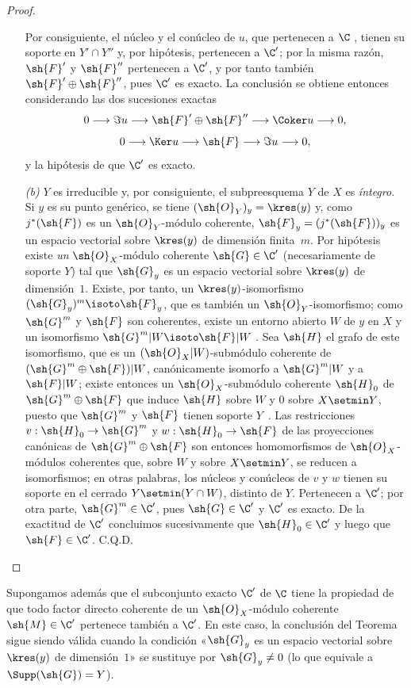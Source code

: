 \documentclass[oneside]{amsart}
\makeatletter
\newcommand{\ega@arrow}[2]{\mathchoice{#1}{#2}{#2}{#2}}
\renewcommand{\to}{\ega@arrow{\longrightarrow}{\rightarrow}}
\let\EGAOriginalLabel\label
\renewcommand{\label}[1]{\phantomsection\EGAOriginalLabel{#1}}
\makeatother
\begin{document}
\begin{proof}
\begin{enumerate}
    Por consiguiente, el núcleo y el conúcleo de $u$, que pertenecen a $\C$ , tienen su soporte en $Y'\cap Y''$ y, por hipótesis, pertenecen a $\C'$; por la misma razón, $\sh{F}'$ y $\sh{F}''$ pertenecen a $\C'$, y por tanto también $\sh{F}'\oplus\sh{F}''$, pues $\C'$ es exacto.
    La conclusión se obtiene entonces considerando las dos sucesiones exactas
    \[
      0\to\Im u\to\sh{F}'\oplus\sh{F}''\to\Coker u\to 0,
    \]
    \[
      0\to\Ker u\to\sh{F}\to\Im u\to 0,
    \]
    y la hipótesis de que $\C'$ es exacto.
  \item[\textit{(b)}] $Y$ es irreducible y, por consiguiente, el subpreesquema $Y$ de $X$ es \emph{íntegro}.
    Si $y$ es su punto genérico, se tiene $(\sh{O}_Y)_y=\kres(y)$ y, como $j^*(\sh{F})$ es un $\sh{O}_Y$-módulo coherente, $\sh{F}_y=(j^*(\sh{F}))_y$ es un espacio vectorial sobre $\kres(y)$ de dimensión finita~$m$.
    Por hipótesis existe \emph{un} $\sh{O}_X$-módulo coherente $\sh{G}\in\C'$ (necesariamente de soporte $Y$) tal que $\sh{G}_y$ es un espacio vectorial sobre $\kres(y)$ de dimensión~$1$.
    Existe, por tanto, un $\kres(y)$-isomorfismo $(\sh{G}_y)^m\isoto\sh{F}_y$, que es también un $\sh{O}_Y$-isomorfismo; como $\sh{G}^m$ y $\sh{F}$ son coherentes, existe un entorno abierto $W$ de $y$ en $X$ y un isomorfismo $\sh{G}^m|W\isoto\sh{F}|W$ .
    Sea $\sh{H}$ el grafo de este isomorfismo, que es un $(\sh{O}_X|W)$-submódulo coherente de $(\sh{G}^m\oplus\sh{F})|W$, canónicamente isomorfo a $\sh{G}^m|W$ y a $\sh{F}|W$; existe entonces un $\sh{O}_X$-submódulo coherente $\sh{H}_0$ de $\sh{G}^m\oplus\sh{F}$ que induce $\sh{H}$ sobre $W$ y $0$ sobre $X\setmin Y$, puesto que $\sh{G}^m$ y $\sh{F}$ tienen soporte $Y$~.
    Las restricciones $v:\sh{H}_0\to\sh{G}^m$ y $w:\sh{H}_0\to\sh{F}$ de las proyecciones canónicas de $\sh{G}^m\oplus\sh{F}$ son entonces homomorfismos de $\sh{O}_X$-módulos coherentes que, sobre $W$ y sobre $X\setmin Y$, se reducen a isomorfismos; en otras palabras, los núcleos y conúcleos de $v$ y $w$ tienen su soporte en el cerrado $Y\setmin(Y\cap W)$, distinto de $Y$.
    Pertenecen a $\C'$; por otra parte, $\sh{G}^m\in\C'$, pues $\sh{G}\in\C'$ y $\C'$ es exacto.
    De la exactitud de $\C'$ concluimos sucesivamente que $\sh{H}_0\in\C'$ y luego que $\sh{F}\in\C'$.
C.Q.D.
\end{enumerate}
\end{proof}

\begin{corollary}[3.1.3]
\label{III.3.1.3}
Supongamos además que el subconjunto exacto $\C'$ de $\C$ tiene la propiedad de que todo factor directo coherente de un $\sh{O}_X$-módulo coherente $\sh{M}\in\C'$ pertenece también a $\C'$.
En este caso, la conclusión del Teorema~ sigue siendo válida cuando la condición «$\sh{G}_y$ es un espacio vectorial sobre $\kres(y)$ de dimensión~$1$» se sustituye por $\sh{G}_y\neq 0$ (lo que equivale a $\Supp(\sh{G})=Y$).
\end{corollary}
\end{document}
